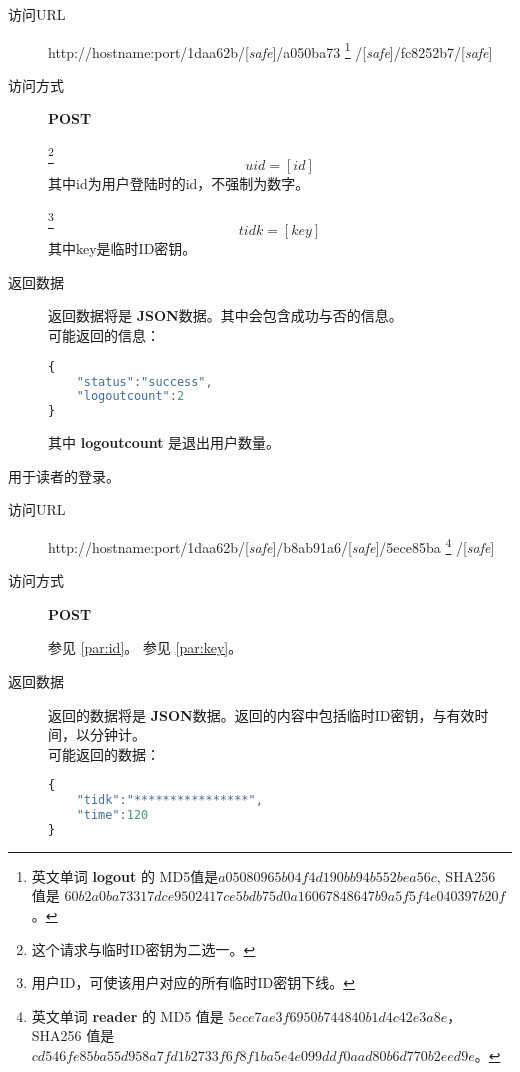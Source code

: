 \documentclass[UTF8]{article}
\def\safe{/[\textit{safe}]}
\def\POST{\colorbox[rgb]{0.77,0.53,0.97}{\textbf{POST}}}
\def\bfJSON{\textbf{JSON}\space}
\def\viaurl{\item[{\quad\colorbox[rgb]{0.47,0.88,0.89}{访问URL}}]}
\def\viareq#1{\item[{\quad\colorbox[rgb]{0.57,0.88,0.99}{访问方式}}] #1}
\def\rtdata{\item[{\quad\colorbox[rgb]{0.70,0.9,0.59}{返回数据}}]}
\begin{document}
    \begin{description}
        \viaurl http://hostname:port/1daa62b\safe/a050ba73
        \footnote{
            英文单词 \textbf{logout} 的
            MD5值是$a05080965b04f4d190bb94b552bea56c $,
            SHA256 值是
            $60b2a0ba73317dce9502417ce5bdb75d0a16067848647b9a5f5f4e040397b20f$。
        }
        \safe/fc8252b7\safe

        \viareq \POST

        \label{par:logout:id}
        \footnote{这个请求与临时ID密钥为二选一。}
        $$uid=[id]$$
        其中id为用户登陆时的id，不强制为数字。

        \label{par:logout:tidk}
        \footnote{用户ID，可使该用户对应的所有临时ID密钥下线。}
        $$tidk=[key]$$
        其中key是临时ID密钥。

        \rtdata 返回数据将是 \bfJSON 数据。其中会包含成功与否的信息。
        \\可能返回的信息：
        \begin{lstlisting}[language=JavaScript]
{
    "status":"success",
    "logoutcount":2
}
        \end{lstlisting}\label{par:logout:example}
        其中 \textbf{logoutcount} 是退出用户数量。
    \end{description}






		用于读者的登录。
		\begin{description}

		\viaurl http://hostname:port/1daa62b\safe /b8ab91a6\safe/5ece85ba
        \footnote{
            英文单词 \textbf{reader} 的
            MD5 值是
            $5ece7ae3f6950b744840b1d4c42e3a8e$，
            SHA256 值是
            $cd546fe85ba55d958a7fd1b2733f6f8f1ba5e4e099ddf0aad80b6d770b2eed9e$。
            }
        \safe

        \viareq \POST

         参见 \ref{par:id}。
         参见 \ref{par:key}。
        \rtdata 返回的数据将是 \bfJSON 数据。返回的内容中包括临时ID密钥，与有效时间，以分钟计。
        \\可能返回的数据：
        \begin{lstlisting}[language=JavaScript]
{
    "tidk":"****************",
    "time":120
}
        \end{lstlisting}
		\end{description}
\end{document}
